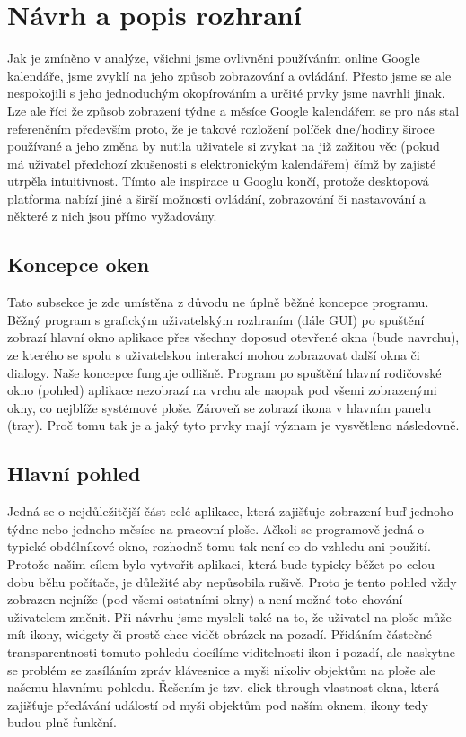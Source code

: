 \documentclass[a4paper, 12pt]{article}[7.12.2013]
\begin{document}
\section{Návrh a popis rozhraní} \label{navrh}
Jak je zmíněno v analýze, všichni jsme ovlivněni používáním online Google kalendáře, jsme zvyklí na jeho způsob zobrazování a ovládání. Přesto jsme se ale nespokojili s jeho jednoduchým okopírováním a určité prvky jsme navrhli jinak. Lze ale říci že způsob zobrazení týdne a měsíce Google kalendářem se pro nás stal referenčním především proto, že je takové rozložení políček dne/hodiny široce používané a jeho změna by nutila uživatele si zvykat na již zažitou věc (pokud má uživatel předchozí zkušenosti s elektronickým kalendářem) čímž by zajisté utrpěla intuitivnost. Tímto ale inspirace u Googlu končí, protože desktopová platforma nabízí jiné a širší možnosti ovládání, zobrazování či nastavování a některé z nich jsou přímo vyžadovány.

\subsection{Koncepce oken}
Tato subsekce je zde umístěna z důvodu ne úplně běžné koncepce programu. Běžný program s grafickým uživatelským rozhraním (dále GUI) po spuštění zobrazí hlavní okno aplikace přes všechny doposud otevřené okna (bude navrchu), ze kterého se spolu s uživatelskou interakcí mohou zobrazovat další okna či dialogy. Naše koncepce funguje odlišně. Program po spuštění hlavní rodičovské okno (pohled) aplikace nezobrazí na vrchu ale naopak pod všemi zobrazenými okny, co nejblíže systémové ploše. Zároveň se zobrazí ikona v hlavním panelu (tray). Proč tomu tak je a jaký tyto prvky mají význam je vysvětleno následovně.

\subsection{Hlavní pohled}
Jedná se o nejdůležitější část celé aplikace, která zajišťuje zobrazení buď jednoho týdne nebo jednoho měsíce na pracovní ploše.  Ačkoli se programově jedná o typické obdélníkové okno, rozhodně tomu tak není co do vzhledu ani použití. Protože našim cílem bylo vytvořit aplikaci, která bude typicky běžet po celou dobu běhu počítače, je důležité aby nepůsobila rušivě. Proto je tento pohled vždy zobrazen nejníže (pod všemi ostatními okny) a není možné toto chování uživatelem změnit. Při návrhu jsme mysleli také na to, že uživatel na ploše může mít ikony, widgety či prostě chce vidět obrázek na pozadí. Přidáním částečné transparentnosti tomuto pohledu docílíme viditelnosti ikon i pozadí, ale naskytne se problém se zasíláním zpráv klávesnice a myši nikoliv objektům na ploše ale našemu hlavnímu pohledu. Řešením je tzv. click-through vlastnost okna, která zajišťuje předávání událostí od myši objektům pod naším oknem, ikony tedy budou plně funkční.
\end{document}
